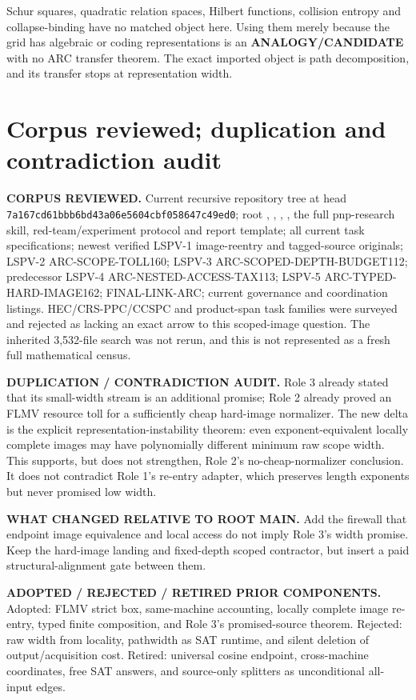 \documentclass[11pt]{article}
\begin{document}
Schur squares, quadratic relation spaces, Hilbert functions, collision
entropy and collapse-binding have no matched object here.  Using them merely
because the grid has algebraic or coding representations is an
\textbf{ANALOGY/CANDIDATE} with no ARC transfer theorem.  The exact imported
object is path decomposition, and its transfer stops at representation width.

\section{Corpus reviewed; duplication and contradiction audit}
\textbf{CORPUS REVIEWED.}  Current recursive repository tree at head
\texttt{7a167cd61bbb6bd43a06e5604cbf058647c49ed0}; root
, , , , the
full pnp-research skill, red-team/experiment protocol and report template;
all current task specifications; newest verified LSPV-1 image-reentry and
tagged-source originals; LSPV-2 ARC-SCOPE-TOLL160; LSPV-3
ARC-SCOPED-DEPTH-BUDGET112; predecessor LSPV-4 ARC-NESTED-ACCESS-TAX113;
LSPV-5 ARC-TYPED-HARD-IMAGE162; FINAL-LINK-ARC; current governance and
coordination listings.  HEC/CRS-PPC/CCSPC and product-span task families were
surveyed and rejected as lacking an exact arrow to this scoped-image question.
The inherited 3,532-file search was not rerun, and this is not represented as
a fresh full mathematical census.

\textbf{DUPLICATION / CONTRADICTION AUDIT.}  Role 3 already stated that its
small-width stream is an additional promise; Role 2 already proved an FLMV
resource toll for a sufficiently cheap hard-image normalizer.  The new delta
is the explicit representation-instability theorem: even exponent-equivalent
locally complete images may have polynomially different minimum raw scope
width.  This supports, but does not strengthen, Role 2's no-cheap-normalizer
conclusion.  It does not contradict Role 1's re-entry adapter, which preserves
length exponents but never promised low width.

\textbf{WHAT CHANGED RELATIVE TO ROOT MAIN.}  Add the firewall that endpoint
image equivalence and local access do not imply Role 3's width promise.  Keep
the hard-image landing and fixed-depth scoped contractor, but insert a paid
structural-alignment gate between them.

\textbf{ADOPTED / REJECTED / RETIRED PRIOR COMPONENTS.}  Adopted: FLMV strict
box, same-machine accounting, locally complete image re-entry, typed finite
composition, and Role 3's promised-source theorem.  Rejected: raw width from
locality, pathwidth as SAT runtime, and silent deletion of output/acquisition
cost.  Retired: universal cosine endpoint, cross-machine coordinates, free
SAT answers, and source-only splitters as unconditional all-input edges.
\end{document}
